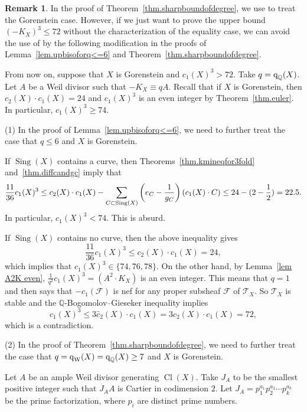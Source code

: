 \documentclass[12pt,twoside]{amsart}
\DeclareMathOperator{\Sing}{Sing}
\DeclareMathOperator{\Cl}{Cl}
\newcommand{\qW}{\text{\rm q}_{\text{\rm W}}}
\newcommand{\qQ}{\text{\rm q}_{\mathbb{Q}}}
\theoremstyle{definition}
\newtheorem{rem}[thm]{Remark}
\begin{document}
\begin{rem}
In the proof of Theorem~\ref{thm.sharpboundofdegree}, we use \cite[Theorem~1.5]{Prokhorov2005} to treat the Gorenstein case. However, if we just want to prove the upper bound $(-K_X)^3\leq 72$ without the characterization of the equality case, we can avoid the use of \cite[Theorem~1.5]{Prokhorov2005} by the following modification in the proofs of Lemma~\ref{lem.upbisoforq<=6} and Theorem~\ref{thm.sharpboundofdegree}.

From now on, suppose that $X$ is Gorenstein and $c_1(X)^3>72$. Take $q=\qQ(X)$.  Let $A$ be a Weil divisor such that $-K_X\equiv qA$. 
Recall that if $X$ is Gorenstein, then $c_2(X)\cdot c_1(X)=24$ and $c_1(X)^3$ is an even integer by Theorem~\ref{thm.euler}. In particular, $c_1(X)^3\geq 74.$

(1) In the proof of Lemma~\ref{lem.upbisoforq<=6}, we need to further treat the case that $q\leq 6$ and $X$ is Gorenstein. 

If $\Sing(X)$ contains a curve, then Theorems~\ref{thm.kmineqfor3fold} and~\ref{thm.diffcandgc} imply that
\[
 \frac{11}{36}c_1(X)^3\leq c_2(X)\cdot c_1(X)-\sum_{C\subset \text{\rm Sing}(X)}\left(e_C-\frac{1}{g_C}\right)(c_1(X)\cdot C)  \leq 24-(2-\frac{1}{2})= 22.5.
 \]
 In particular, $c_1(X)^3<74$. This is absurd.


If $\Sing(X)$ contains no curve, 
then the above inequality gives 
\[
 \frac{11}{36}c_1(X)^3\leq c_2(X)\cdot c_1(X)=24,
 \]
 which implies that $c_1(X)^3\in\{74,76, 78\}$. 
 On the other hand, by Lemma~\ref{lem A2K even}, $\frac{1}{q^2}c_1(X)^3=(A^2\cdot K_X)$ is an even integer. This means that $q=1$ and then \cite[Proposition 3.6]{LiuLiu2023} says that $-c_1(\mathcal{F})$ is nef for any proper subsheaf $\mathcal{F}$ of $\mathcal{T}_X$. So $\mathcal{T}_X$ is stable and the $\mathbb{Q}$-Bogomolov--Gieseker inequality implies 
\[
c_1(X)^3\leq 3\hat{c}_2(X)\cdot c_1(X) = 3c_2(X)\cdot c_1(X) = 72,
\]
which is a contradiction.

 (2) In the proof of Theorem~\ref{thm.sharpboundofdegree}, we need to further treat the case that $q=\qW(X)=\qQ(X)\geq 7$ and $X$ is Gorenstein. 

 Let $A$ be an ample Weil divisor generating $\Cl (X)$. Take $J_A$ to be the smallest positive integer such that $J_AA$ is Cartier in codimension $2$. Let $J_A=p_1^{a_1}p_2^{a_2}\cdots p_k^{a_k}$ be the prime factorization, where $p_i$ are distinct prime numbers.


\end{rem}
\end{document}
